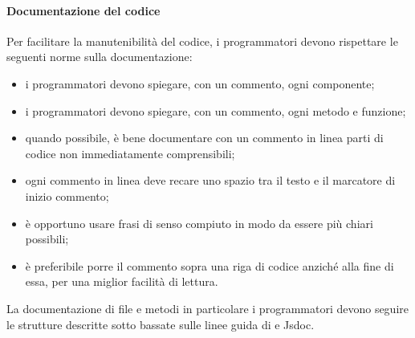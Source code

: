 	\paragraph{Documentazione del codice}
	Per facilitare la manutenibilità del codice, i programmatori devono rispettare le seguenti norme sulla documentazione:
	\begin{itemize}
		\item i programmatori devono spiegare, con un commento, ogni componente;
		\item i programmatori devono spiegare, con un commento, ogni metodo e funzione;
		\item quando possibile, è bene documentare con un commento in linea parti di codice non immediatamente comprensibili;
		\item ogni commento in linea deve recare uno spazio tra il testo e il marcatore di inizio commento;
		\item è opportuno usare frasi di senso compiuto in modo da essere più chiari possibili;
		\item è preferibile porre il commento sopra una riga di codice anziché alla fine di essa, per una miglior facilità di lettura.
	\end{itemize}
	La documentazione di file e metodi in particolare i programmatori devono seguire le strutture descritte sotto bassate sulle linee guida di  e Jsdoc.
